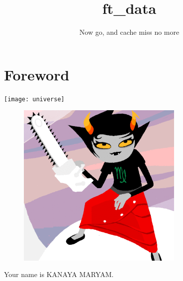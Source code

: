 \documentclass{42-en}
\begin{document}
                           \title{ft_data}
                          \subtitle{Now go, and cache miss no more}


\maketitle

\tableofcontents


\chapter{Foreword}

    \texttt{[image: universe]}


    \begin{figure}[H]
        \begin{center}
            \includegraphics[width=8cm]{kanaya.gif}
        \end{center}
    \end{figure}

    Your name is KANAYA MARYAM.\\
\end{document}
